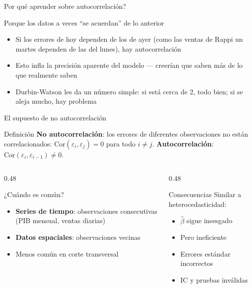 \documentclass[aspectratio=169, 11pt]{beamer}
\begin{document}
\begin{frame}{\textquestiondown{}Por qu\'e aprender sobre autocorrelaci\'on?}
\begin{exampleblock}{Porque los datos a veces ``se acuerdan'' de lo anterior}
\small
\begin{itemize}\setlength{\itemsep}{2pt}
  \item Si los errores de hoy dependen de los de ayer (como las ventas de Rappi un martes dependen de las del lunes), hay autocorrelaci\'on
  \item Esto infla la precisi\'on aparente del modelo --- creer\'ian que saben m\'as de lo que realmente saben
  \item Durbin-Watson les da un n\'umero simple: si est\'a cerca de 2, todo bien; si se aleja mucho, hay problema
\end{itemize}
\end{exampleblock}
\end{frame}

\begin{frame}{El supuesto de no autocorrelación}
\begin{block}{Definición}
\textbf{No autocorrelación}: los errores de diferentes observaciones no están correlacionados:
$\text{Cor}(\varepsilon_i, \varepsilon_j) = 0$ para todo $i \neq j$.
\textbf{Autocorrelación}: $\text{Cor}(\varepsilon_i, \varepsilon_{i-1}) \neq 0$.
\end{block}

\vspace{0.1cm}
\begin{columns}
\begin{column}{0.48\textwidth}
\begin{exampleblock}{¿Cuándo es común?}
\begin{itemize}
\item \textbf{Series de tiempo}: observaciones consecutivas (PIB mensual, ventas diarias)
\item \textbf{Datos espaciales}: observaciones vecinas
\item Menos común en corte transversal
\end{itemize}
\end{exampleblock}
\end{column}

\begin{column}{0.48\textwidth}
\begin{alertblock}{Consecuencias}
Similar a heterocedasticidad:
\begin{itemize}
\item $\hat{\beta}$ sigue insesgado
\item Pero ineficiente
\item Errores estándar incorrectos
\item IC y pruebas inválidas
\end{itemize}
\end{alertblock}
\end{column}
\end{columns}
\end{frame}
\end{document}
